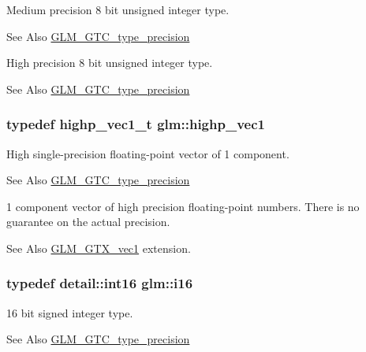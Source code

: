 Medium precision 8 bit unsigned integer type. \begin{DoxySeeAlso}{See Also}
\hyperlink{group__gtc__type__precision}{G\-L\-M\-\_\-\-G\-T\-C\-\_\-type\-\_\-precision}
\end{DoxySeeAlso}
High precision 8 bit unsigned integer type. \begin{DoxySeeAlso}{See Also}
\hyperlink{group__gtc__type__precision}{G\-L\-M\-\_\-\-G\-T\-C\-\_\-type\-\_\-precision} 
\end{DoxySeeAlso}
\hypertarget{group__gtc__type__precision_gab3f08c031846e7a95b49e81c48d920d3}{
\subsubsection[{highp\-\_\-vec1}]{\setlength{\rightskip}{0pt plus 5cm}typedef highp\-\_\-vec1\-\_\-t {\bf glm\-::highp\-\_\-vec1}}}\label{group__gtc__type__precision_gab3f08c031846e7a95b49e81c48d920d3}
High single-\/precision floating-\/point vector of 1 component. \begin{DoxySeeAlso}{See Also}
\hyperlink{group__gtc__type__precision}{G\-L\-M\-\_\-\-G\-T\-C\-\_\-type\-\_\-precision}
\end{DoxySeeAlso}
1 component vector of high precision floating-\/point numbers. There is no guarantee on the actual precision. \begin{DoxySeeAlso}{See Also}
\hyperlink{group__gtx__vec1}{G\-L\-M\-\_\-\-G\-T\-X\-\_\-vec1} extension. 
\end{DoxySeeAlso}
\hypertarget{group__gtc__type__precision_ga35e5542ca05b29cc256fdafb8503d1fd}{
\subsubsection[{i16}]{\setlength{\rightskip}{0pt plus 5cm}typedef detail\-::int16 {\bf glm\-::i16}}}\label{group__gtc__type__precision_ga35e5542ca05b29cc256fdafb8503d1fd}
16 bit signed integer type. \begin{DoxySeeAlso}{See Also}
\hyperlink{group__gtc__type__precision}{G\-L\-M\-\_\-\-G\-T\-C\-\_\-type\-\_\-precision} 
\end{DoxySeeAlso}
